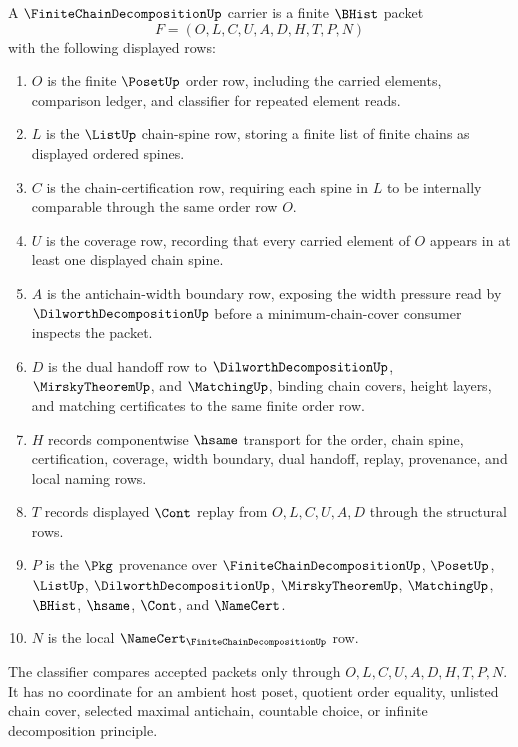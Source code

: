 \begin{definition}
\label{def:finite-chain-decomposition-carrier}
A $\FiniteChainDecompositionUp$ carrier is a finite $\BHist$ packet
$$
F=(O,L,C,U,A,D,H,T,P,N)
$$
with the following displayed rows:
\begin{enumerate}
\item $O$ is the finite $\PosetUp$ order row, including the carried elements, comparison ledger, and classifier for repeated element reads.
\item $L$ is the $\ListUp$ chain-spine row, storing a finite list of finite chains as displayed ordered spines.
\item $C$ is the chain-certification row, requiring each spine in $L$ to be internally comparable through the same order row $O$.
\item $U$ is the coverage row, recording that every carried element of $O$ appears in at least one displayed chain spine.
\item $A$ is the antichain-width boundary row, exposing the width pressure read by $\DilworthDecompositionUp$ before a minimum-chain-cover consumer inspects the packet.
\item $D$ is the dual handoff row to $\DilworthDecompositionUp$, $\MirskyTheoremUp$, and $\MatchingUp$, binding chain covers, height layers, and matching certificates to the same finite order row.
\item $H$ records componentwise $\hsame$ transport for the order, chain spine, certification, coverage, width boundary, dual handoff, replay, provenance, and local naming rows.
\item $T$ records displayed $\Cont$ replay from $O,L,C,U,A,D$ through the structural rows.
\item $P$ is the $\Pkg$ provenance over $\FiniteChainDecompositionUp$, $\PosetUp$, $\ListUp$, $\DilworthDecompositionUp$, $\MirskyTheoremUp$, $\MatchingUp$, $\BHist$, $\hsame$, $\Cont$, and $\NameCert$.
\item $N$ is the local $\NameCert_{\FiniteChainDecompositionUp}$ row.
\end{enumerate}
The classifier compares accepted packets only through $O,L,C,U,A,D,H,T,P,N$. It has no coordinate for an ambient host poset, quotient order equality, unlisted chain cover, selected maximal antichain, countable choice, or infinite decomposition principle.
\end{definition}

